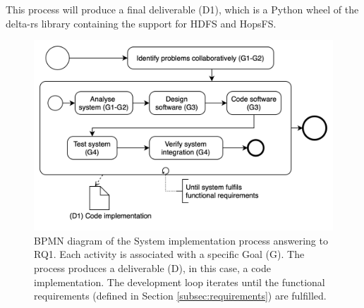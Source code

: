 This process will produce a final deliverable (D1), which is a Python wheel of the delta-rs library containing the support for \gls{HDFS} and \gls{HopsFS}.

\begin{figure}[!ht]
    \begin{center}
      \includegraphics[width=\textwidth]{figures/3-method/research_process_rq1.png}
    \caption[System implementation process]{\gls{BPMN} diagram of the System implementation process answering to RQ1. Each activity is associated with a specific Goal (\gls{G}). The process produces a deliverable (\gls{D}), in this case, a code implementation. The development loop iterates until the functional requirements (defined in Section \ref{subsec:requirements}) are fulfilled.}
    \label{fig:DevProcessRQ1}
    \end{center}
\end{figure}

